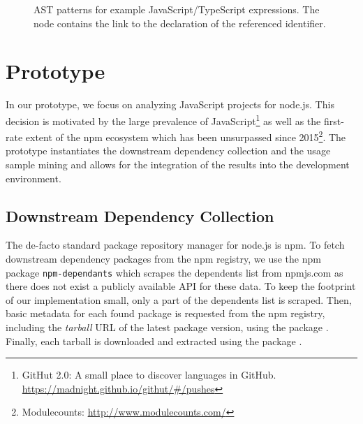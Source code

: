 \documentclass[a4paper,twoside]{article}
\begin{document}
\begin{figure}
\begin{minipage}{\linewidth}
\begin{center}
\begin{subfigure}[t]{.30\linewidth}
{                	
                }
			\end{subfigure}

            \vspace{\baselineskip}
			\caption{AST patterns for example JavaScript/TypeScript expressions.
				The  node contains the link to the declaration of the referenced identifier.
			}
			\label{fig:approach/usage_mining/patterns}
		\end{center}
	\end{minipage}
\end{figure}

\section{Prototype}
\label{sec:implementation}

In our prototype, we focus on analyzing JavaScript projects for node.js.
This decision is motivated by the large prevalence of JavaScript\footnote{GitHut 2.0: A small place to discover languages in GitHub. \url{https://madnight.github.io/githut/\#/pushes}} as well as the first-rate extent of the npm ecosystem which has been unsurpassed since 2015\footnote{Modulecounts: \url{http://www.modulecounts.com/}}.
The prototype instantiates the downstream dependency collection and the usage sample mining and allows for the integration of the results into the development environment.

\subsection{Downstream Dependency Collection}
\label{sec:implementation/dependency_collection}

The de-facto standard package repository manager for node.js is npm.
To fetch downstream dependency packages from the npm registry, we use the npm package \texttt{npm-dependants} which scrapes the dependents list from npmjs.com as there does not exist a publicly available API for these data.
To keep the footprint of our implementation small, only a part of the dependents list is scraped.
Then, basic metadata for each found package is requested from the npm registry, including the \emph{tarball} URL of the latest package version, using the package .
Finally, each tarball is downloaded and extracted using the package .
\end{document}
